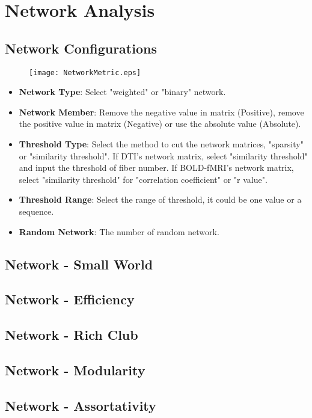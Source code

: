 \documentclass[11pt]{article}
\begin{document}
	\section{Network Analysis}
		\subsection{Network Configurations}
			\begin{figure}
				\begin{center}
					\texttt{[image: NetworkMetric.eps]}
				\end{center}
			\end{figure}
			\begin{itemize}
				\item \textbf{Network Type}: Select "weighted" or "binary" network.
				\item \textbf{Network Member}: Remove the negative value in matrix (Positive), remove the positive value in matrix (Negative) or use the absolute value (Absolute).
				\item \textbf{Threshold Type}: Select the method to cut the network matrices, "sparsity" or "similarity threshold". 
					If DTI's network matrix, select "similarity threshold" and input the threshold of fiber number.
					If BOLD-fMRI's network matrix, select "similarity threshold" for "correlation coefficient" or "r value". 
				\item \textbf{Threshold Range}: Select the range of threshold, it could be one value or a sequence.
				\item \textbf{Random Network}: The number of random network.
			\end{itemize}
		\subsection{Network - Small World}
		\subsection{Network - Efficiency}
		\subsection{Network - Rich Club}
		\subsection{Network - Modularity}
		\subsection{Network - Assortativity}
\end{document}
